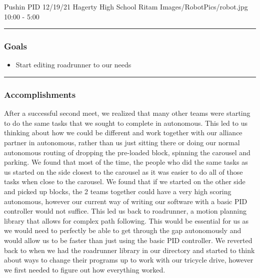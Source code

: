 \insertmeeting 
	{Pushin PID} 
	{12/19/21} 
	{Hagerty High School}
	{Ritam}
	{Images/RobotPics/robot.jpg}
	{10:00 - 5:00}
	
\noindent\hfil\rule{\textwidth}{.4pt}\hfil
\subsubsection*{Goals}
\begin{itemize}
    \item Start editing roadrunner to our needs 

\end{itemize} 

\noindent\hfil\rule{\textwidth}{.4pt}\hfil

\subsubsection*{Accomplishments}
After a successful second meet, we realized that many other teams were starting to do the same tasks that we sought to complete in autonomous. This led to us thinking about how we could be different and work together with our alliance partner in autonomous, rather than us just sitting there or doing our normal autonomous routing of dropping the pre-loaded block, spinning the carousel and parking. We found that most of the time, the people who did the same tasks as us started on the side closest to the carousel as it was easier to do all of those tasks when close to the carousel. We found that if we started on the other side and picked up blocks, the 2 teams together could have a very high scoring autonomous, however our current way of writing our software with a basic PID controller would not suffice. This led us back to roadrunner, a motion planning library that allows for complex path following. This would be essential for us as we would need to perfectly be able to get through the gap autonomously and would allow us to be faster than just using the basic PID controller. We reverted back to when we had the roadrunner library in our directory and started to think about ways to change their programs up to work with our tricycle drive, however we first needed to figure out how everything worked. 



